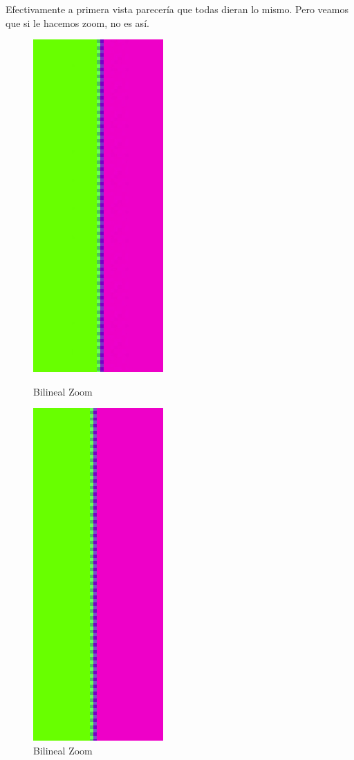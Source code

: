 Efectivamente a primera vista parecería que todas dieran lo mismo. Pero veamos que si le hacemos zoom, no es así.
\begin{figure}[!htb]
\begin{center}
    \includegraphics[scale=0.6]{imagenes/colores_bilineal_zoom.jpg}
    \caption{Bilineal Zoom}
        \end{center}
\endminipage
{}
\begin{center}
    \includegraphics[scale=0.6]{imagenes/colores_hq_zoom.jpg}
    \caption{Bilineal Zoom}
        \end{center}
\endminipage 
\end{figure}
